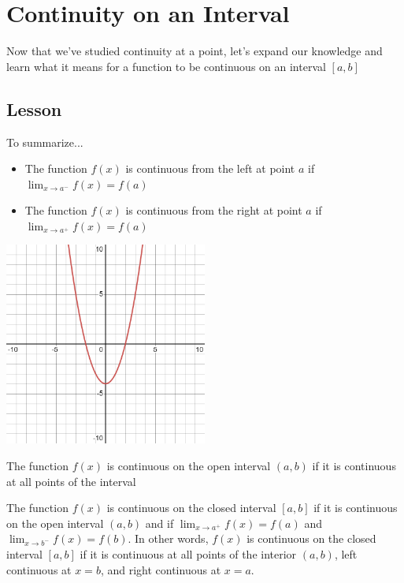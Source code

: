 \documentclass{ximera}
\begin{document}
\section{Continuity on an Interval}

Now that we've studied continuity at a point, let's expand our knowledge and learn what it means for a function to be continuous on an interval $[a,b]$

\subsection{Lesson}
\begin{center}
\end{center}

To summarize...

\begin{explanation}
    \begin{foldable}
        \begin{itemize}
            \item The function $f(x)$ is continuous from the left at point $a$ if $\lim_{x \to a^-} f(x) = f(a)$
            \item The function $f(x)$ is continuous from the right at point $a$ if $\lim_{x \to a^+} f(x) = f(a)$
        \end{itemize}
        \begin{center}            
        \includegraphics[width=0.5\textwidth]{graph4.png}
        \end{center}
    \end{foldable}

    \begin{foldable}
        The function $f(x)$ is continuous on the open interval $(a,b)$ if it is continuous at all points of the interval
    \end{foldable}

    \begin{foldable}
        The function $f(x)$ is continuous on the closed interval $[a,b]$ if it is continuous on the open interval $(a,b)$ and if $\lim_{x \to a^+} f(x) = f(a)$ and $\lim_{x \to b^-} f(x) = f(b)$.
        In other words, $f(x)$ is continuous on the closed interval $[a,b]$ if it is continuous at all points of the interior $(a,b)$, left continuous at $x=b$, and right continuous at $x=a$.
    \end{foldable}{}
\end{explanation}
\end{document}
